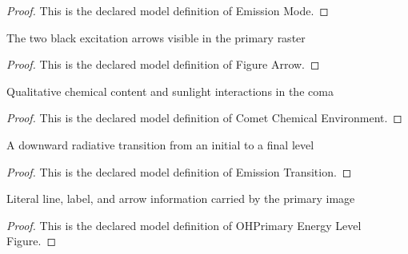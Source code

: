 \begin{proof}
  This is the declared model definition of Emission Mode.
\end{proof}
\begin{definition}
  \label{def:physics:phyx-mini-0577:phyxminiproblems-problemphyxmini0577-figurearrow}
  The two black excitation arrows visible in the primary raster
\end{definition}
\begin{proof}
  This is the declared model definition of Figure Arrow.
\end{proof}
\begin{definition}
  \label{def:physics:phyx-mini-0577:phyxminiproblems-problemphyxmini0577-cometchemicalenvironment}
  Qualitative chemical content and sunlight interactions in the coma
\end{definition}
\begin{proof}
  This is the declared model definition of Comet Chemical Environment.
\end{proof}
\begin{definition}
  \label{def:physics:phyx-mini-0577:phyxminiproblems-problemphyxmini0577-emissiontransition}
  A downward radiative transition from an initial to a final level
\end{definition}
\begin{proof}
  This is the declared model definition of Emission Transition.
\end{proof}
\begin{definition}
  \label{def:physics:phyx-mini-0577:phyxminiproblems-problemphyxmini0577-ohprimaryenergylevelfigure}
  Literal line, label, and arrow information carried by the primary image
\end{definition}
\begin{proof}
  This is the declared model definition of OHPrimary Energy Level Figure.
\end{proof}
